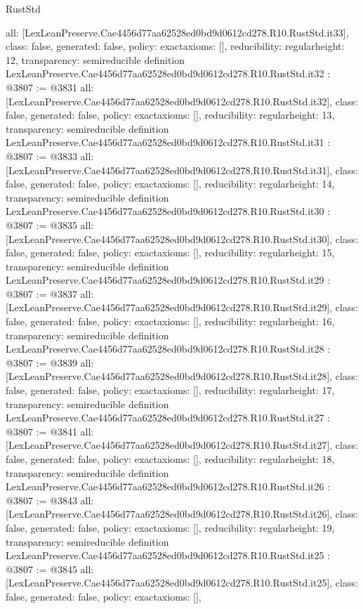\begin{lexlean}{RustStd}
\begin{coremodule}
{  all: [LexLeanPreserve.Cae4456d77aa62528ed0bd9d0612cd278.R10.RustStd.it33],
  class: false,
  generated: false,
  policy: exact{axioms: []},
  reducibility: regular{height: 12},
  transparency: semireducible
}
definition LexLeanPreserve.Cae4456d77aa62528ed0bd9d0612cd278.R10.RustStd.it32 : @3807 := @3831 {
  all: [LexLeanPreserve.Cae4456d77aa62528ed0bd9d0612cd278.R10.RustStd.it32],
  class: false,
  generated: false,
  policy: exact{axioms: []},
  reducibility: regular{height: 13},
  transparency: semireducible
}
definition LexLeanPreserve.Cae4456d77aa62528ed0bd9d0612cd278.R10.RustStd.it31 : @3807 := @3833 {
  all: [LexLeanPreserve.Cae4456d77aa62528ed0bd9d0612cd278.R10.RustStd.it31],
  class: false,
  generated: false,
  policy: exact{axioms: []},
  reducibility: regular{height: 14},
  transparency: semireducible
}
definition LexLeanPreserve.Cae4456d77aa62528ed0bd9d0612cd278.R10.RustStd.it30 : @3807 := @3835 {
  all: [LexLeanPreserve.Cae4456d77aa62528ed0bd9d0612cd278.R10.RustStd.it30],
  class: false,
  generated: false,
  policy: exact{axioms: []},
  reducibility: regular{height: 15},
  transparency: semireducible
}
definition LexLeanPreserve.Cae4456d77aa62528ed0bd9d0612cd278.R10.RustStd.it29 : @3807 := @3837 {
  all: [LexLeanPreserve.Cae4456d77aa62528ed0bd9d0612cd278.R10.RustStd.it29],
  class: false,
  generated: false,
  policy: exact{axioms: []},
  reducibility: regular{height: 16},
  transparency: semireducible
}
definition LexLeanPreserve.Cae4456d77aa62528ed0bd9d0612cd278.R10.RustStd.it28 : @3807 := @3839 {
  all: [LexLeanPreserve.Cae4456d77aa62528ed0bd9d0612cd278.R10.RustStd.it28],
  class: false,
  generated: false,
  policy: exact{axioms: []},
  reducibility: regular{height: 17},
  transparency: semireducible
}
definition LexLeanPreserve.Cae4456d77aa62528ed0bd9d0612cd278.R10.RustStd.it27 : @3807 := @3841 {
  all: [LexLeanPreserve.Cae4456d77aa62528ed0bd9d0612cd278.R10.RustStd.it27],
  class: false,
  generated: false,
  policy: exact{axioms: []},
  reducibility: regular{height: 18},
  transparency: semireducible
}
definition LexLeanPreserve.Cae4456d77aa62528ed0bd9d0612cd278.R10.RustStd.it26 : @3807 := @3843 {
  all: [LexLeanPreserve.Cae4456d77aa62528ed0bd9d0612cd278.R10.RustStd.it26],
  class: false,
  generated: false,
  policy: exact{axioms: []},
  reducibility: regular{height: 19},
  transparency: semireducible
}
definition LexLeanPreserve.Cae4456d77aa62528ed0bd9d0612cd278.R10.RustStd.it25 : @3807 := @3845 {
  all: [LexLeanPreserve.Cae4456d77aa62528ed0bd9d0612cd278.R10.RustStd.it25],
  class: false,
  generated: false,
  policy: exact{axioms: []},
}
\end{coremodule}
\end{lexlean}
